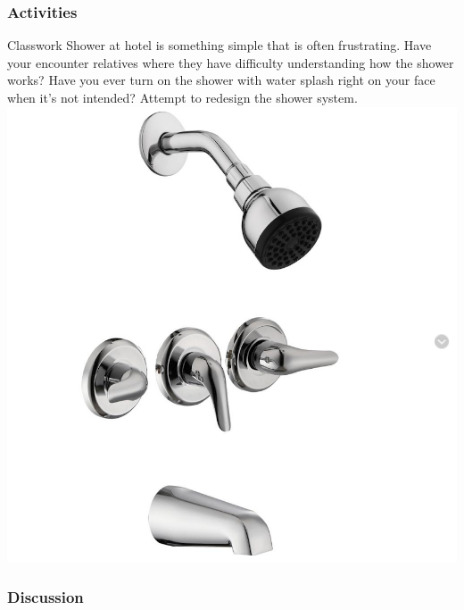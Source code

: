 \documentclass{beamer}
\begin{document}

\begin{frame}
	\frametitle{Activities}
	\begin{block}{Classwork}
		\footnotesize
		Shower at hotel is something simple that is often frustrating.  Have your encounter relatives where they have difficulty understanding how the shower works?  Have you ever turn on the shower with water splash right on your face when it's not intended?  Attempt to redesign the shower system. \\
		\centering
		\includegraphics[width=.3\linewidth]{faucet}
	\end{block}
\end{frame}


\begin{frame}
	\frametitle{Discussion}
\end{frame}

%	
\end{document}
